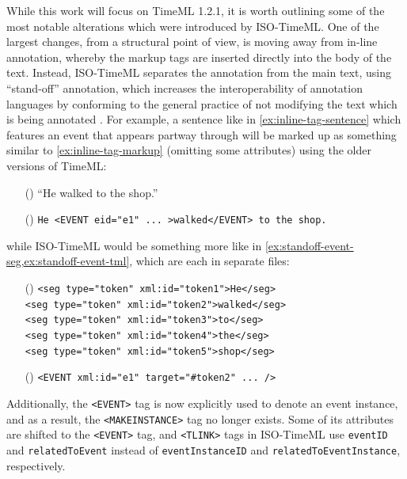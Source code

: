 \documentclass[a4paper,12pt,leqno]{article}
\newcommand{\ipp}{(\refstepcounter{equation}\theequation)}
\begin{document}
While this work will focus on TimeML 1.2.1, it is worth outlining some of the most notable alterations which were introduced by ISO-TimeML. One of the largest changes, from a structural point of view, is moving away from in-line annotation, whereby the markup tags are inserted directly into the body of the text. Instead, ISO-TimeML separates the annotation from the main text, using ``stand-off'' annotation, which increases the interoperability of annotation languages by conforming to the general practice of not modifying the text which is being annotated \citep[p. 395]{pustejovsky2010iso}. For example, a sentence like in \cref{ex:inline-tag-sentence} which features an event that appears partway through will be marked up as something similar to \cref{ex:inline-tag-markup} (omitting some attributes) using the older versions of TimeML:
\begin{itemize}
	\item[\ipp\label{ex:inline-tag-sentence}] ``He walked to the shop.''
	\item[\ipp\label{ex:inline-tag-markup}] \verb|He <EVENT eid="e1" ... >walked</EVENT> to the shop.|
\end{itemize}
while ISO-TimeML would be something more like in \cref{ex:standoff-event-seg,ex:standoff-event-tml}, which are each in separate files:
\begin{itemize}
	\item[\ipp\label{ex:standoff-event-seg}] \verb|<seg type="token" xml:id="token1">He</seg>|\\\verb|<seg type="token" xml:id="token2">walked</seg>|\\\verb|<seg type="token" xml:id="token3">to</seg>|\\\verb|<seg type="token" xml:id="token4">the</seg>|\\\verb|<seg type="token" xml:id="token5">shop</seg>|
	\item[\ipp\label{ex:standoff-event-tml}] \verb|<EVENT xml:id="e1" target="#token2" ... />|
\end{itemize}
Additionally, the \verb|<EVENT>| tag is now explicitly used to denote an event instance, and as a result, the \verb|<MAKEINSTANCE>| tag no longer exists. Some of its attributes are shifted to the \verb|<EVENT>| tag, and \verb|<TLINK>| tags in ISO-TimeML use \texttt{eventID} and \texttt{relatedToEvent} instead of \texttt{eventInstanceID} and \texttt{relatedToEventInstance}, respectively.
\end{document}
